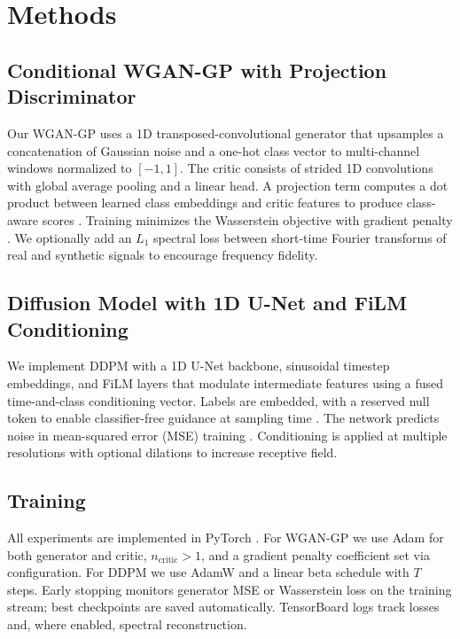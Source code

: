 \documentclass{article}
\begin{document}

\section{Methods}
\subsection{Conditional WGAN-GP with Projection Discriminator}
Our WGAN-GP uses a 1D transposed-convolutional generator that upsamples a concatenation of Gaussian noise and a one-hot class vector to multi-channel windows normalized to $[-1,1]$. The critic consists of strided 1D convolutions with global average pooling and a linear head. A projection term computes a dot product between learned class embeddings and critic features to produce class-aware scores \citep{miyato2018cgans}. Training minimizes the Wasserstein objective with gradient penalty \citep{gulrajani2017improved}. We optionally add an $L_1$ spectral loss between short-time Fourier transforms of real and synthetic signals to encourage frequency fidelity.

\subsection{Diffusion Model with 1D U-Net and FiLM Conditioning}
We implement DDPM with a 1D U-Net backbone, sinusoidal timestep embeddings, and FiLM layers that modulate intermediate features using a fused time-and-class conditioning vector. Labels are embedded, with a reserved null token to enable classifier-free guidance at sampling time \citep{ho2022classifierfree}. The network predicts noise in mean-squared error (MSE) training \citep{ho2020denoising}. Conditioning is applied at multiple resolutions with optional dilations to increase receptive field.

\subsection{Training}
All experiments are implemented in PyTorch \citep{paszke2019pytorch}. For WGAN-GP we use Adam \citep{kingma2015adam} for both generator and critic, $n_\text{critic}>1$, and a gradient penalty coefficient set via configuration. For DDPM we use AdamW \citep{loshchilov2019decoupled} and a linear beta schedule with $T$ steps. Early stopping monitors generator MSE or Wasserstein loss on the training stream; best checkpoints are saved automatically. TensorBoard logs track losses and, where enabled, spectral reconstruction.
\end{document}
